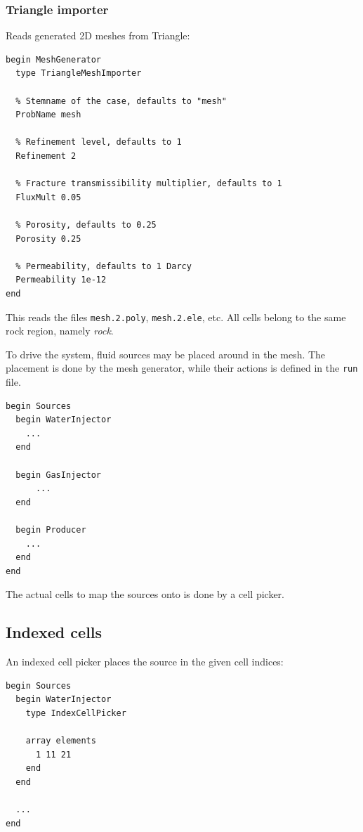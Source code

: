 \subsubsection{Triangle importer}

Reads generated 2D meshes from Triangle:

\begin{verbatim}
begin MeshGenerator
  type TriangleMeshImporter

  % Stemname of the case, defaults to "mesh"
  ProbName mesh

  % Refinement level, defaults to 1
  Refinement 2

  % Fracture transmissibility multiplier, defaults to 1
  FluxMult 0.05

  % Porosity, defaults to 0.25
  Porosity 0.25

  % Permeability, defaults to 1 Darcy
  Permeability 1e-12
end
\end{verbatim}
This reads the files \texttt{mesh.2.poly}, \texttt{mesh.2.ele}, etc.
All cells belong to the same rock region, namely \emph{rock}.


\label{sec:gg:sources}

To drive the system, fluid sources may be placed around in the mesh.
The placement is done by the mesh generator, while their actions is
defined in the \texttt{run} file.

\begin{verbatim}
begin Sources
  begin WaterInjector
    ...
  end

  begin GasInjector
      ...
  end

  begin Producer
    ...
  end
end
\end{verbatim}

The actual cells to map the sources onto is done by a cell picker.


\subsection{Indexed cells}

An indexed cell picker places the source in the given cell indices:

\begin{verbatim}
begin Sources
  begin WaterInjector
    type IndexCellPicker

    array elements
      1 11 21
    end
  end

  ...
end
\end{verbatim}

